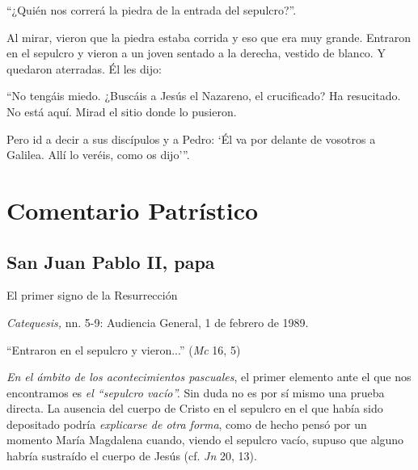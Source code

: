 			\begin{readtalk}“¿Quién nos correrá la piedra de la entrada del sepulcro?”. \end{readtalk}
			
			\begin{readbody}Al mirar, vieron que la piedra estaba corrida y eso que era muy grande. Entraron en el sepulcro y vieron a un joven sentado a la derecha, vestido de blanco. Y quedaron aterradas. Él les dijo: \end{readbody}
			
			\begin{readtalk}“No tengáis miedo. ¿Buscáis a Jesús el Nazareno, el crucificado? Ha resucitado. No está aquí. Mirad el sitio donde lo pusieron. \end{readtalk}
			
			\begin{readtalk}Pero id a decir a sus discípulos y a Pedro: ‘Él va por delante de vosotros a Galilea. Allí lo veréis, como os dijo’”.\end{readtalk}
			
			\section{Comentario Patrístico}
			
			\subsection{San Juan Pablo II, papa}
			
			\begin{patertheme}El primer signo de la Resurrección\end{patertheme}
			
			\begin{patersource}\textit{Catequesis, }nn. 5-9: Audiencia General, 1 de febrero de 1989.\end{patersource}
			
			\begin{body} “Entraron en el sepulcro y vieron...” (\textit{Mc} 16, 5)\end{body}
			
			\begin{body}\textit{En el ámbito de los acontecimientos pascuales}, el primer elemento ante el que nos encontramos es \textit{el “sepulcro vacío”. }Sin duda no es por sí mismo una prueba directa. La ausencia del cuerpo de Cristo en el sepulcro en el que había sido depositado podría \textit{explicarse de otra forma}, como de hecho pensó por un momento María Magdalena cuando, viendo el sepulcro vacío, supuso que alguno habría sustraído el cuerpo de Jesús (cf. \textit{Jn} 20, 13).\end{body}
			
